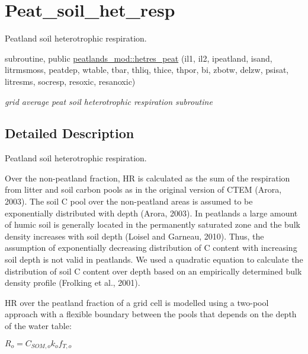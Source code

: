 \hypertarget{group__peat__soil__het__resp}{}\section{Peat\+\_\+soil\+\_\+het\+\_\+resp}
\label{group__peat__soil__het__resp}


Peatland soil heterotrophic respiration.  


\begin{DoxyCompactItemize}
\item 
subroutine, public \hyperlink{group__peat__soil__het__resp_gaed12b76ec8925a4bc3105f8ae7a36888}{peatlands\+\_\+mod\+::hetres\+\_\+peat} (il1, il2, ipeatland, isand, litrmsmoss, peatdep, wtable, tbar, thliq, thice, thpor, bi, zbotw, delzw, psisat, litresms, socresp, resoxic, resanoxic)
\begin{DoxyCompactList}\small\item\em grid average peat soil heterotrophic respiration subroutine \end{DoxyCompactList}\end{DoxyCompactItemize}


\subsection{Detailed Description}
Peatland soil heterotrophic respiration. 

Over the non-\/peatland fraction, H\+R is calculated as the sum of the respiration from litter and soil carbon pools as in the original version of C\+T\+E\+M (Arora, 2003). The soil C pool over the non-\/peatland areas is assumed to be exponentially distributed with depth (Arora, 2003). In peatlands a large amount of humic soil is generally located in the permanently saturated zone and the bulk density increases with soil depth (Loisel and Garneau, 2010). Thus, the assumption of exponentially decreasing distribution of C content with increasing soil depth is not valid in peatlands. We used a quadratic equation to calculate the distribution of soil C content over depth based on an empirically determined bulk density profile (Frolking et al., 2001).

H\+R over the peatland fraction of a grid cell is modelled using a two-\/pool approach with a flexible boundary between the pools that depends on the depth of the water table\+:

$ R_{o}=C_{SOM,o}k_{o}f_{T,{o}} $

